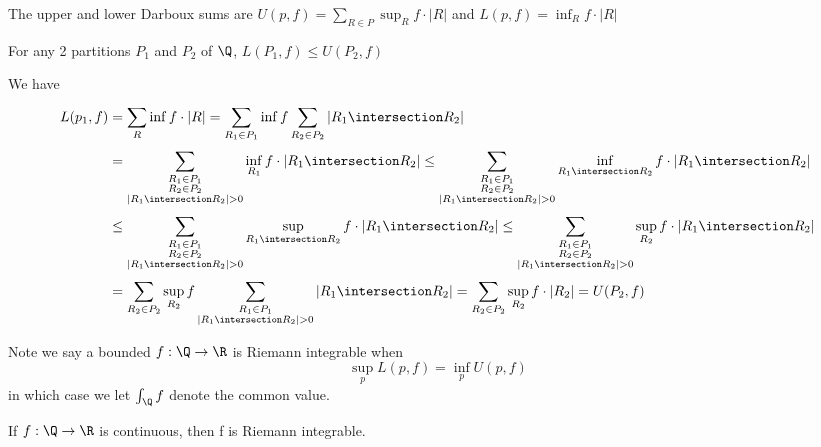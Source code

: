 \vline

The upper and lower Darboux sums are $U(p,f) =\sum_{R \in P}^{} \sup_R f \cdot |R|$ and \newline
$L(p,f) = \inf_R f \cdot |R|$

\begin{lemma}
	For any 2 partitions $P_1$ and $P_2$ of  $\Q$,  $L(P_1,f) \leq U(P_2, f)$
\end{lemma}

\begin{solution}
	We have
	\begin{align*}
		L(p_1, f) &= \sum_{R}^{}  \inf f \cdot |R| = \sum_{R_1 \in P_1}^{} \inf f
		\sum_{R_2 \in P_2}^{} |R_1 \intersection R_2 | \\
				  &= \sum_{\substack{R_1 \in P_1 \\ R_2 \in P_2 \\ |R_1 \intersection R_2 | > 0} }^{} \inf_{R_1} f \cdot |R_1 \intersection R_2 |
				  \leq \sum_{\substack{R_1 \in P_1 \\ R_2 \in P_2 \\ |R_1 \intersection R_2 | > 0} }^{} \inf_{R_1 \intersection R_2} f \cdot |R_1 \intersection R_2 | \\
				  &\leq \sum_{\substack{R_1 \in P_1 \\ R_2 \in P_2 \\ |R_1 \intersection R_2 | > 0} }^{} \sup_{R_1 \intersection R_2} f \cdot |R_1 \intersection R_2 |
				  \leq \sum_{\substack{R_1 \in P_1 \\ R_2 \in P_2 \\ |R_1 \intersection R_2 | > 0} }^{} \sup_{R_2} f \cdot |R_1 \intersection R_2 | \\
				  &= \sum_{R_2 \in P_2}^{} \sup_{R_2} f \sum_{\substack{R_1 \in P_1 \\ |R_1 \intersection R_2 | > 0}}^{} |R_1 \intersection R_2 |  = \sum_{R_2 \in P_2}^{} \sup_{R_2} f \cdot |R_2| = U(P_2, f)
	\end{align*}
\end{solution}


Note we say a bounded $f : \Q \to \R$ is Riemann integrable when  
\[\sup_p L(p,f) = \inf_p U(p,f)\]
in which case we let  $\int_{\Q} f$ denote the common value.


\begin{theorem}
	If $f : \Q \to \R$	 is continuous, then f is Riemann integrable.
\end{theorem}

